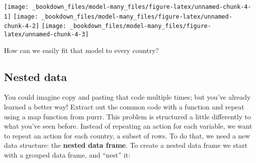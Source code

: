 \documentclass[]{book}
\newenvironment{Shaded}{\begin{snugshade}}{\end{snugshade}}
\newcommand{\KeywordTok}[1]{\textcolor[rgb]{0.13,0.29,0.53}{\textbf{{#1}}}}
\newcommand{\DataTypeTok}[1]{\textcolor[rgb]{0.13,0.29,0.53}{{#1}}}
\newcommand{\DecValTok}[1]{\textcolor[rgb]{0.00,0.00,0.81}{{#1}}}
\newcommand{\StringTok}[1]{\textcolor[rgb]{0.31,0.60,0.02}{{#1}}}
\newcommand{\NormalTok}[1]{{#1}}
\begin{document}
\begin{Shaded}
\end{Shaded}

\texttt{[image: \_bookdown\_files/model-many\_files/figure-latex/unnamed-chunk-4-1]}
\texttt{[image: \_bookdown\_files/model-many\_files/figure-latex/unnamed-chunk-4-2]}
\texttt{[image: \_bookdown\_files/model-many\_files/figure-latex/unnamed-chunk-4-3]}

How can we easily fit that model to every country?

\subsection{Nested data}\label{nested-data}

You could imagine copy and pasting that code multiple times; but you've
already learned a better way! Extract out the common code with a
function and repeat using a map function from purrr. This problem is
structured a little differently to what you've seen before. Instead of
repeating an action for each variable, we want to repeat an action for
each country, a subset of rows. To do that, we need a new data
structure: the \textbf{nested data frame}. To create a nested data frame
we start with a grouped data frame, and ``nest'' it:
\end{document}
